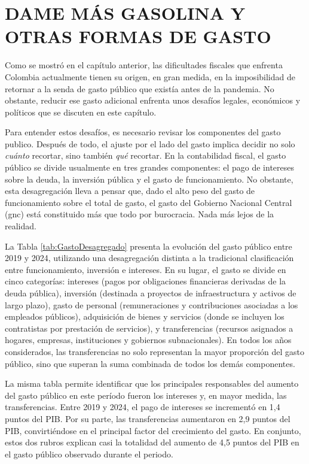 \chapter{DAME M\'AS GASOLINA Y OTRAS FORMAS DE GASTO}\label{chap:fepc}

Como se mostró en el capítulo anterior, las dificultades fiscales que enfrenta Colombia actualmente tienen su origen, en gran medida, en la imposibilidad de retornar a la senda de gasto público que existía antes de la pandemia. No obstante, reducir ese gasto adicional enfrenta unos desafíos legales, económicos y políticos que se discuten en este capítulo.

Para entender estos desafíos, es necesario revisar los componentes del gasto publico. Después de todo, el ajuste por el lado del gasto implica decidir no solo \textit{cuánto} recortar, sino también \textit{qué} recortar. En la contabilidad fiscal, el gasto público se divide usualmente en tres grandes componentes: el pago de intereses sobre la deuda, la inversión pública y el gasto de funcionamiento. No obstante, esta desagregación lleva a pensar que, dado el alto peso del gasto de funcionamiento sobre el total de gasto, el gasto del Gobierno Nacional Central (\gls{gnc}) está constituido más que todo por burocracia. Nada más lejos de la realidad.



La Tabla \ref{tab:GastoDesagregado} presenta la evolución del gasto público entre 2019 y 2024, utilizando una desagregación distinta a la tradicional clasificación entre funcionamiento, inversión e intereses. En su lugar, el gasto se divide en cinco categorías: intereses (pagos por obligaciones financieras derivadas de la deuda pública), inversión (destinada a proyectos de infraestructura y activos de largo plazo), gasto de personal (remuneraciones y contribuciones asociadas a los empleados públicos), adquisición de bienes y servicios (donde se incluyen los contratistas por prestación de servicios), y transferencias (recursos asignados a hogares, empresas, instituciones y gobiernos subnacionales). En todos los años considerados, las transferencias no solo representan la mayor proporción del gasto público, sino que superan la suma combinada de todos los demás componentes.

La misma tabla permite identificar que los principales responsables del aumento del gasto público en este período fueron los intereses y, en mayor medida, las transferencias. Entre 2019 y 2024, el pago de intereses se incrementó en 1,4 puntos del PIB. Por su parte, las transferencias aumentaron en 2,9 puntos del PIB, convirtiéndose en el principal factor del crecimiento del gasto. En conjunto, estos dos rubros explican casi la totalidad del aumento de 4,5 puntos del PIB en el gasto público observado durante el periodo.

